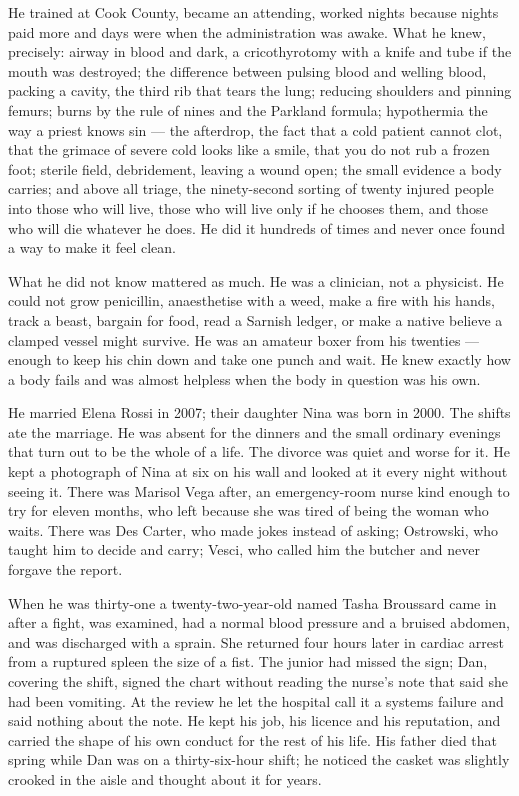 \documentclass{design/chronicle}
\begin{document}
{He trained at Cook County, became an attending, worked nights because nights paid more and days were when the administration was awake. What he knew, precisely: airway in blood and dark, a cricothyrotomy with a knife and tube if the mouth was destroyed; the difference between pulsing blood and welling blood, packing a cavity, the third rib that tears the lung; reducing shoulders and pinning femurs; burns by the rule of nines and the Parkland formula; hypothermia the way a priest knows sin — the afterdrop, the fact that a cold patient cannot clot, that the grimace of severe cold looks like a smile, that you do not rub a frozen foot; sterile field, debridement, leaving a wound open; the small evidence a body carries; and above all triage, the ninety-second sorting of twenty injured people into those who will live, those who will live only if he chooses them, and those who will die whatever he does. He did it hundreds of times and never once found a way to make it feel clean.

What he did not know mattered as much. He was a clinician, not a physicist. He could not grow penicillin, anaesthetise with a weed, make a fire with his hands, track a beast, bargain for food, read a Sarnish ledger, or make a native believe a clamped vessel might survive. He was an amateur boxer from his twenties — enough to keep his chin down and take one punch and wait. He knew exactly how a body fails and was almost helpless when the body in question was his own.

He married Elena Rossi in 2007; their daughter Nina was born in 2000. The shifts ate the marriage. He was absent for the dinners and the small ordinary evenings that turn out to be the whole of a life. The divorce was quiet and worse for it. He kept a photograph of Nina at six on his wall and looked at it every night without seeing it. There was Marisol Vega after, an emergency-room nurse kind enough to try for eleven months, who left because she was tired of being the woman who waits. There was Des Carter, who made jokes instead of asking; Ostrowski, who taught him to decide and carry; Vesci, who called him the butcher and never forgave the report.

When he was thirty-one a twenty-two-year-old named Tasha Broussard came in after a fight, was examined, had a normal blood pressure and a bruised abdomen, and was discharged with a sprain. She returned four hours later in cardiac arrest from a ruptured spleen the size of a fist. The junior had missed the sign; Dan, covering the shift, signed the chart without reading the nurse’s note that said she had been vomiting. At the review he let the hospital call it a systems failure and said nothing about the note. He kept his job, his licence and his reputation, and carried the shape of his own conduct for the rest of his life. His father died that spring while Dan was on a thirty-six-hour shift; he noticed the casket was slightly crooked in the aisle and thought about it for years.

}
\end{document}
